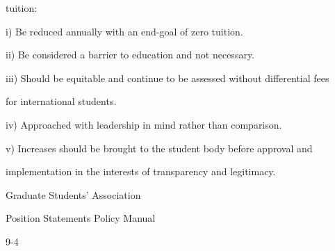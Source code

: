 tuition:  



         i)        Be reduced annually with an end-goal of zero tuition.                       



         ii)       Be considered a barrier to education and not necessary.  



         iii)      Should be equitable and continue to be assessed without differential fees  

                   for international students.  



         iv)       Approached with leadership in mind rather than comparison.  



         v)        Increases  should  be  brought  to  the  student  body  before  approval  and  

                   implementation in the interests of transparency and legitimacy.  



                                    Graduate Students’ Association  



                                  Position Statements Policy Manual  



                                                      9-4  

